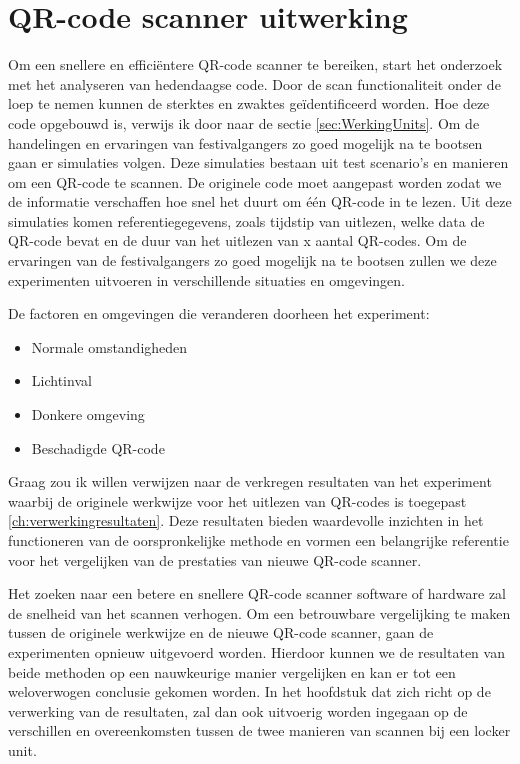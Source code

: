 \section{QR-code scanner uitwerking}%
\label{sec:scannerUitwerking}

Om een snellere en efficiëntere QR-code scanner te bereiken, start het onderzoek met het analyseren van hedendaagse code. Door de scan functionaliteit onder de loep te nemen kunnen de sterktes en zwaktes geïdentificeerd worden. Hoe deze code opgebouwd is, verwijs ik door naar de sectie \ref{sec:WerkingUnits}.
Om de handelingen en ervaringen van festivalgangers zo goed mogelijk na te bootsen gaan er simulaties volgen. Deze simulaties bestaan uit test scenario’s en manieren om een QR-code te scannen. De originele code moet aangepast worden zodat we de informatie verschaffen hoe snel het duurt om één QR-code in te lezen. Uit deze simulaties komen referentiegegevens, zoals tijdstip van uitlezen, welke data de QR-code bevat en de duur van het uitlezen van x aantal QR-codes. Om de ervaringen van de festivalgangers zo goed mogelijk na te bootsen zullen we deze experimenten uitvoeren in verschillende situaties en omgevingen.

De factoren en omgevingen die veranderen doorheen het experiment:

\begin{itemize}
    \item Normale omstandigheden
    \item Lichtinval
    \item Donkere omgeving
    \item Beschadigde QR-code     
\end{itemize}


Graag zou ik willen verwijzen naar de verkregen resultaten van het experiment waarbij de originele werkwijze voor het uitlezen van QR-codes is toegepast \ref{ch:verwerkingresultaten}. Deze resultaten bieden waardevolle inzichten in het functioneren van de oorspronkelijke methode en vormen een belangrijke referentie voor het vergelijken van de prestaties van nieuwe QR-code scanner.

Het zoeken naar een betere en snellere QR-code scanner software of hardware zal de snelheid van het scannen verhogen. Om een betrouwbare vergelijking te maken tussen de originele werkwijze en de nieuwe QR-code scanner, gaan de experimenten opnieuw uitgevoerd worden. Hierdoor kunnen we de resultaten van beide methoden op een nauwkeurige manier vergelijken en kan er tot een weloverwogen conclusie gekomen worden. In het hoofdstuk dat zich richt op de verwerking van de resultaten, zal dan ook uitvoerig worden ingegaan op de verschillen en overeenkomsten tussen de twee manieren van scannen bij een locker unit.

